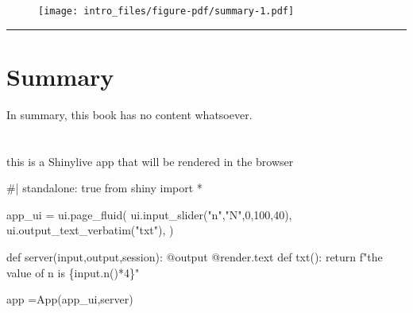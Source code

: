 \documentclass[
  letterpaper,
  DIV=11,
  numbers=noendperiod]{scrreprt}
\newenvironment{Shaded}{}{}
\newcommand{\FunctionTok}[1]{\textcolor[rgb]{0.44,0.26,0.76}{#1}}
\newcommand{\NormalTok}[1]{\textcolor[rgb]{0.14,0.16,0.18}{#1}}
\newcommand{\SpecialCharTok}[1]{\textcolor[rgb]{0.00,0.36,0.77}{#1}}
\begin{document}
\begin{Shaded}
\end{Shaded}

\begin{figure}[H]

{\centering \texttt{[image: intro\_files/figure-pdf/summary-1.pdf]}

}

\end{figure}

\begin{center}\rule{0.5\linewidth}{0.5pt}\end{center}

\noindent 


\hypertarget{summary-1}{%
\chapter{Summary}\label{summary-1}}

In summary, this book has no content whatsoever.


\hypertarget{section}{%
\chapter{}\label{section}}

this is a Shinylive app that will be rendered in the browser

\begin{Shaded}
\begin{Highlighting}[]
\NormalTok{\#| standalone: true}
\NormalTok{from shiny import *}

\NormalTok{app\_ui = ui.page\_fluid(}
\NormalTok{  ui.input\_slider("n","N",0,100,40),}
\NormalTok{  ui.output\_text\_verbatim("txt"),}
\NormalTok{)}

\NormalTok{def server(input,output,session):}
\NormalTok{  @output}
\NormalTok{  @render.text }
\NormalTok{  def txt():}
\NormalTok{    return f"the value of n is \{input.n()*4\}"}

\NormalTok{app =App(app\_ui,server)}
\end{Highlighting}
\end{Shaded}
\end{document}
